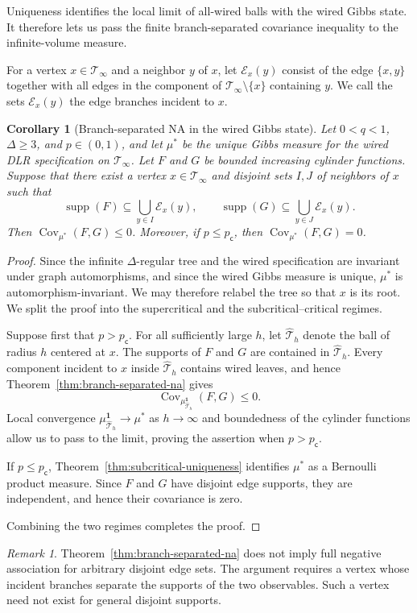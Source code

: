 \documentclass[11pt]{amsart}
\theoremstyle{plain}
\newtheorem{corollary}[theorem]{Corollary}
\theoremstyle{definition}
\theoremstyle{remark}
\newtheorem{remark}[theorem]{Remark}
\newcommand{\dreg}{\widehat {\mathcal T}_h}
\newcommand{\pc}{p_{\mathsf{c}}}
\begin{document}
Uniqueness identifies the local limit of all-wired balls with the wired Gibbs state. It therefore lets us pass the finite branch-separated covariance inequality to the infinite-volume measure.

For a vertex $x\in\mathcal T_\infty$ and a neighbor $y$ of $x$, let $\mathcal E_x(y)$ consist of the edge $\{x,y\}$ together with all edges in the component of $\mathcal T_\infty\setminus\{x\}$ containing $y$. We call the sets $\mathcal E_x(y)$ the edge branches incident to $x$. 

\begin{corollary}[Branch-separated NA in the wired Gibbs state]
\label{cor:infinite-branch-na}
Let $0<q<1$, $\Delta\ge3$, and $p\in(0,1)$, and let $\mu^*$ be
the unique Gibbs measure for the wired DLR specification on
$\mathcal T_\infty$. Let $F$ and $G$ be bounded increasing cylinder functions. Suppose that there exist a vertex $x\in\mathcal T_\infty$ and disjoint sets $I,J$ of neighbors of $x$ such that
\[
    \operatorname{supp}(F)
    \subseteq
    \bigcup_{y\in I}\mathcal E_x(y),
    \qquad
    \operatorname{supp}(G)
    \subseteq
    \bigcup_{y\in J}\mathcal E_x(y).
\]
Then $\operatorname{Cov}_{\mu^*}(F,G)\le0$. Moreover, if $p\le\pc$, then $\operatorname{Cov}_{\mu^*}(F,G)=0$.
\end{corollary}

\begin{proof}
Since the infinite $\Delta$-regular tree and the wired specification are invariant under graph automorphisms, and since the wired Gibbs measure is unique, $\mu^*$ is automorphism-invariant. We may therefore relabel the tree so that $x$ is its root. We split the proof into the supercritical and the subcritical--critical regimes.

Suppose first that $p>\pc$. For all sufficiently large $h$, let $\dreg$ denote the ball of radius $h$ centered at $x$. The supports of $F$ and $G$ are contained in $\dreg$. Every component incident to $x$ inside $\dreg$ contains wired leaves, and hence Theorem~\ref{thm:branch-separated-na} gives 
\[
    \operatorname{Cov}_{\mu_{\dreg}^{\mathbf 1}}(F,G)
    \le0.
\]
Local convergence $\mu_{\dreg}^{\mathbf 1}\to\mu^*$ as $h\to\infty$ and boundedness of the cylinder functions allow us to pass to the limit, proving the assertion when $p>\pc$.

If $p\le\pc$, Theorem~\ref{thm:subcritical-uniqueness} identifies
$\mu^*$ as a Bernoulli product measure. Since $F$ and
$G$ have disjoint edge supports, they are independent, and hence their
covariance is zero.

Combining the two regimes completes the proof.
\end{proof}
\begin{remark}
Theorem~\ref{thm:branch-separated-na} does not imply full negative association for arbitrary disjoint edge sets. The argument requires a vertex whose incident branches separate the supports of the two observables. Such a vertex need not exist for general disjoint supports.
\end{remark}
\end{document}

